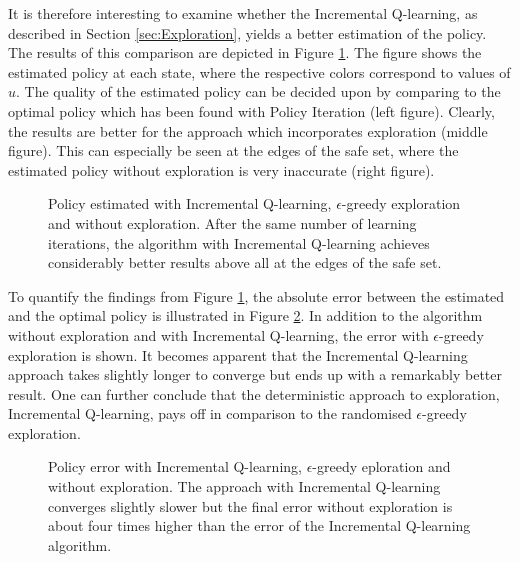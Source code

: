 \documentclass[../main.tex]{subfiles}
\begin{document}
It is therefore interesting to examine whether the Incremental Q-learning, as described in Section \ref{sec:Exploration}, yields a better estimation of the policy. The results of this comparison are depicted in Figure \ref{fig:policy_exploration}. The figure shows the estimated policy at each state, where the respective colors correspond to values of $u$. The quality of the estimated policy can be decided upon by comparing to the optimal policy which has been found with Policy Iteration (left figure). Clearly, the results are better for the approach which incorporates exploration (middle figure). This can especially be seen at the edges of the safe set, where the estimated policy without exploration is very inaccurate (right figure).

\begin{figure}[H]
    \centering
    \caption{Policy estimated with Incremental Q-learning, $\epsilon$-greedy exploration and without exploration. After the same number of learning iterations, the algorithm with Incremental Q-learning achieves considerably better results above all at the edges of the safe set.} \label{fig:policy_exploration}
\end{figure}

To quantify the findings from Figure \ref{fig:policy_exploration}, the absolute error between the estimated and the optimal policy is illustrated in Figure \ref{fig:PolicyError}. In addition to the algorithm without exploration and with Incremental Q-learning, the error with $\epsilon$-greedy exploration is shown. It becomes apparent that the Incremental Q-learning approach takes slightly longer to converge but ends up with a remarkably better result. One can further conclude that the deterministic approach to exploration, Incremental Q-learning, pays off in comparison to the randomised $\epsilon$-greedy exploration. 

\begin{figure}[H]
    \centering
    \caption{Policy error with Incremental Q-learning, $\epsilon$-greedy eploration and without exploration. The approach with Incremental Q-learning converges slightly slower but the final error without exploration is about four times higher than the error of the Incremental Q-learning algorithm.} \label{fig:PolicyError}
\end{figure}
\end{document}
